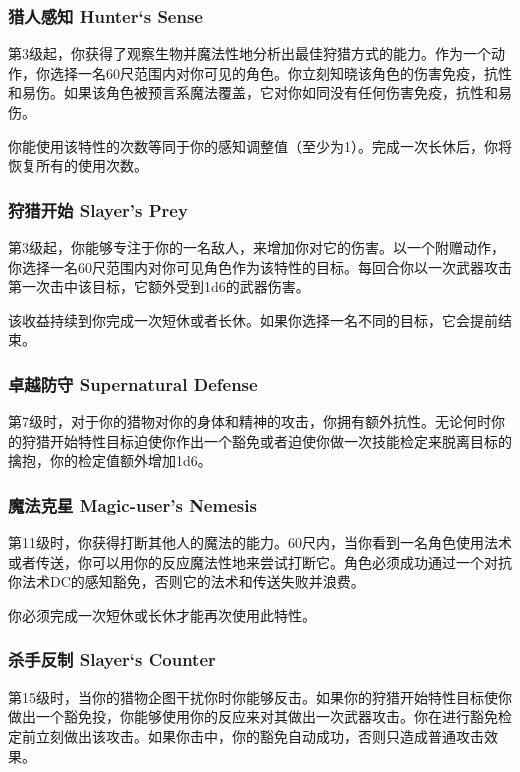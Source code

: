 \subsubsection{猎人感知 Hunter`s Sense}第3级起，你获得了观察生物并魔法性地分析出最佳狩猎方式的能力。作为一个动作，你选择一名60尺范围内对你可见的角色。你立刻知晓该角色的伤害免疫，抗性和易伤。如果该角色被预言系魔法覆盖，它对你如同没有任何伤害免疫，抗性和易伤。

你能使用该特性的次数等同于你的感知调整值（至少为1）。完成一次长休后，你将恢复所有的使用次数。

\subsubsection{狩猎开始 Slayer's Prey}第3级起，你能够专注于你的一名敌人，来增加你对它的伤害。以一个附赠动作，你选择一名60尺范围内对你可见角色作为该特性的目标。每回合你以一次武器攻击第一次击中该目标，它额外受到1d6的武器伤害。

该收益持续到你完成一次短休或者长休。如果你选择一名不同的目标，它会提前结束。

\subsubsection{卓越防守 Supernatural Defense}第7级时，对于你的猎物对你的身体和精神的攻击，你拥有额外抗性。无论何时你的狩猎开始特性目标迫使你作出一个豁免或者迫使你做一次技能检定来脱离目标的擒抱，你的检定值额外增加1d6。

\subsubsection{魔法克星 Magic-user's Nemesis}第11级时，你获得打断其他人的魔法的能力。60尺内，当你看到一名角色使用法术或者传送，你可以用你的反应魔法性地来尝试打断它。角色必须成功通过一个对抗你法术DC的感知豁免，否则它的法术和传送失败并浪费。

你必须完成一次短休或长休才能再次使用此特性。

\subsubsection{杀手反制 Slayer`s Counter}第15级时，当你的猎物企图干扰你时你能够反击。如果你的狩猎开始特性目标使你做出一个豁免投，你能够使用你的反应来对其做出一次武器攻击。你在进行豁免检定前立刻做出该攻击。如果你击中，你的豁免自动成功，否则只造成普通攻击效果。